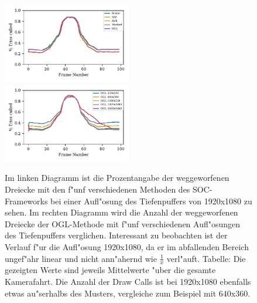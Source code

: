 \documentclass[journal]{vgtc}
\begin{document}
\begin{figure}
	\begin{minipage}{\textwidth}
		\includegraphics[width=0.5\textwidth]{images/Evaluation_1_Results_Percentage culled.pdf}
		\includegraphics[width=0.5\textwidth]{images/Evaluation_4_Results_Percentage culled.pdf}
	\end{minipage}
	\begin{minipage}{\textwidth}
		\centering
	\end{minipage}
	\caption{Im linken Diagramm ist die Prozentangabe der weggeworfenen Dreiecke mit den f"unf verschiedenen Methoden des SOC-Frameworks bei einer Aufl"osung des Tiefenpuffers von 1920x1080 zu sehen. Im rechten Diagramm wird die Anzahl der weggeworfenen Dreiecke der OGL-Methode mit f"unf verschiedenen Aufl"osungen des Tiefenpuffers verglichen. Interessant zu beobachten ist der Verlauf f"ur die Aufl"osung 1920x1080, da er im abfallenden Bereich ungef"ahr linear und nicht ann"ahernd wie $\frac{1}{x}$ verl"auft. Tabelle: Die gezeigten Werte sind jeweils Mittelwerte "uber die gesamte Kamerafahrt. Die Anzahl der Draw Calls ist bei 1920x1080 ebenfalls etwas au"serhalbs des Musters, vergleiche zum Beispiel mit 640x360.}
	\label{fig:resolution_culled}
\end{figure}
\end{document}
